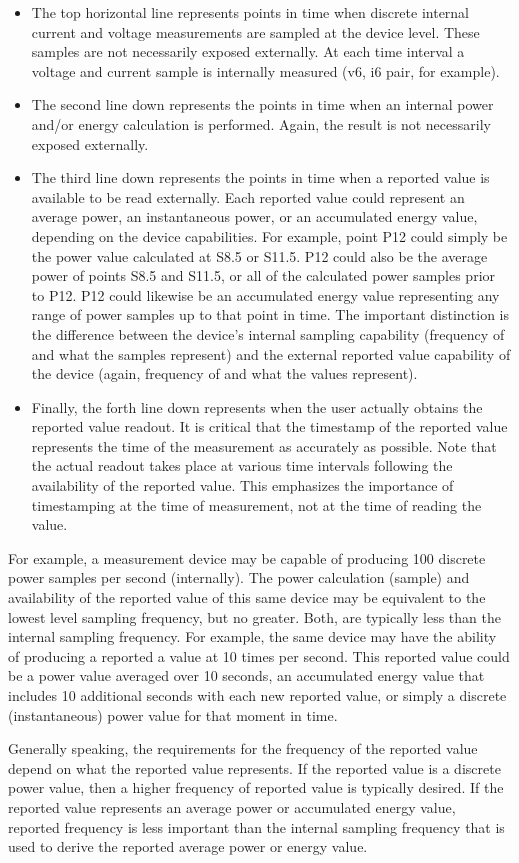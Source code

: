 \begin{itemize}
\begin{itemize}
\item
The top horizontal line represents points in time when discrete internal current and 
voltage measurements are sampled at the device level. These samples are not necessarily 
exposed externally. At each time interval a voltage and current sample is internally 
measured (v6, i6 pair, for example).  
\item
The second line down represents the points in time when an internal power and/or 
energy calculation is performed. Again, the result is not necessarily exposed externally.
\item
The third line down represents the points in time when a reported value is available to be read 
externally. Each reported value could represent an average power, an instantaneous power, 
or an accumulated energy value, depending on the device capabilities. For example, 
point P12 could simply be the power value calculated at S8.5 or S11.5. P12 could also 
be the average power of points S8.5 and S11.5, or all of the calculated power samples prior to P12. 
P12 could likewise be an accumulated energy value representing any range of power samples 
up to that point in time. The important distinction is the difference between the device's 
internal sampling capability (frequency of and what the samples represent) and the external 
reported value capability of the device (again, frequency of and what the values represent).
\item
Finally, the forth line down represents when the user actually obtains the reported value 
readout. It is critical that the timestamp of the reported value represents the time 
of the measurement as accurately as possible. Note that the actual readout takes place 
at various time intervals following the availability of the reported value. This emphasizes 
the importance of timestamping at the time of measurement, not at the time of reading the value.
\end{itemize}

For example, a measurement device may be capable of producing 100 discrete power 
samples per second (internally). The power calculation (sample) and availability of the 
reported value of this same device may be equivalent to the lowest level sampling frequency, 
but no greater. Both, are typically less than the internal sampling frequency. For example, 
the same device may have the ability of producing a reported a value at 10 times per second. 
This reported value could be a power value averaged over 10 seconds, an accumulated energy value 
that includes 10 additional seconds with each new reported value, or simply a discrete 
(instantaneous) power value for that moment in time. 

Generally speaking, the requirements for the frequency of the reported value depend on 
what the reported value represents. If the reported value is a discrete power value, 
then a higher frequency of reported value is typically desired. If the reported value 
represents an average power or accumulated energy value, reported frequency is less 
important than the internal sampling frequency that is used to derive the reported 
average power or energy value.
\end{itemize}

